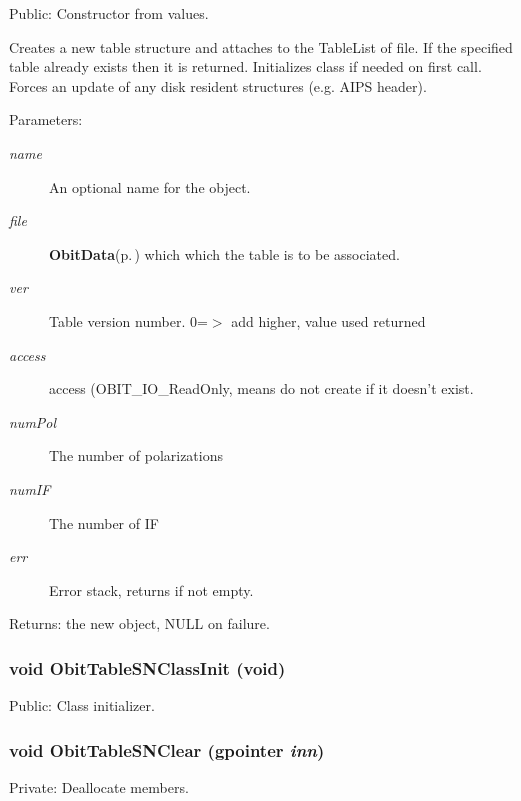 Public: Constructor from values. 

Creates a new table structure and attaches to the Table\-List of file. If the specified table already exists then it is returned. Initializes class if needed on first call. Forces an update of any disk resident structures (e.g. AIPS header). \begin{Desc}
\item[Parameters:]
\begin{description}
\item[{\em name}]An optional name for the object. \item[{\em file}]{\bf Obit\-Data}{\rm (p.\,\pageref{structObitData})} which which the table is to be associated. \item[{\em ver}]Table version number. 0=$>$ add higher, value used returned \item[{\em access}]access (OBIT\_\-IO\_\-Read\-Only, means do not create if it doesn't exist. \item[{\em num\-Pol}]The number of polarizations \item[{\em num\-IF}]The number of IF \item[{\em err}]Error stack, returns if not empty. \end{description}
\end{Desc}
\begin{Desc}
\item[Returns:]the new object, NULL on failure. \end{Desc}
\subsubsection{\setlength{\rightskip}{0pt plus 5cm}void Obit\-Table\-SNClass\-Init (void)}\label{ObitTableSN_8c_a27}


Public: Class initializer. 

\subsubsection{\setlength{\rightskip}{0pt plus 5cm}void Obit\-Table\-SNClear (gpointer {\em inn})}\label{ObitTableSN_8c_a9}


Private: Deallocate members. 

